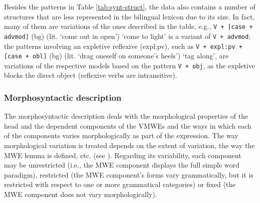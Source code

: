 \documentclass[output=paper,colorlinks,citecolor=brown]{langscibook}
\begin{document}
Besides the patterns in Table \ref{tab:synt-struct}, the data also contains a number of structures that are less represented in the bilingual lexicon due to its size. In fact, many of them are variations of the ones described in the table, e.g., \texttt{V + [case + advmod]}  (bg)  (lit. `come out in open') {`come to light'} 
is a variant of \texttt{V + advmod}; the patterns involving an expletive reflexive (expl:pv), such as \texttt{V + expl:pv + [case + obl]} (bg)  (lit. `drag oneself on someone's heels') {`tag along'}, 
are variations of the respective models based on the pattern \texttt{V + obj}, as the expletive blocks the direct object (reflexive verbs are intransitive). %

\subsubsection{Morphosyntactic description}
\largerpage

The morphosyntactic description deals with the morphological properties of the head and the dependent components of the VMWEs and the ways in which each of the components varies morphologically as part of the expression. The way morphological variation is treated depends on the extent of variation, the way the MWE lemma is defined, etc. (see ). Regarding its variability, each component may be unrestricted (i.e., the MWE component displays the full simple word paradigm), restricted (the MWE component’s forms vary grammatically, but it is restricted with respect to one or more grammatical categories) or fixed (the MWE component does not vary morphologically). 
\end{document}

